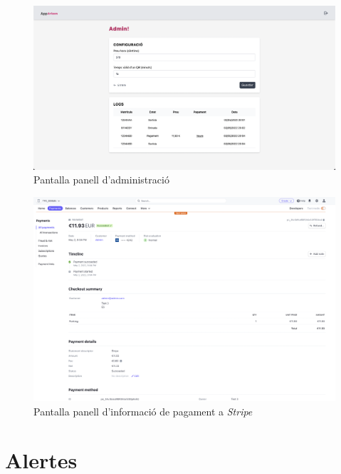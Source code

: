 \begin{figure}[H]
    \begin{center}
        \includegraphics[scale=0.25]{Fotos/pantalla12_admin.png}
    \end{center}
    \caption{Pantalla panell d'administració}
    \label{fig:admin_photo}
\end{figure}

\begin{figure}[H]
    \begin{center}
        \includegraphics[scale=0.25]{Fotos/pantalla13_stripe.png}
    \end{center}
    \caption{Pantalla panell d'informació de pagament a \emph{Stripe}}
    \label{fig:stripe_info_photo}
\end{figure}

\newpage
\section{Alertes}

